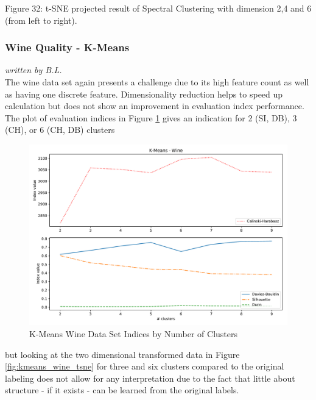  Figure 32:  t-SNE projected result of Spectral Clustering with dimension 2,4 and 6 (from left to right). \newline

\subsubsection{Wine Quality - K-Means}
\textit{written by B.L.}\\


The wine data set again presents a challenge due to its high feature count as well as having one discrete feature. Dimensionality reduction helps to speed up calculation but does not show an improvement in evaluation index performance. The plot of evaluation indices in Figure \ref{fig:kmeans_wine_indices_comparison} gives an indication for 2 (\gls{SI}, \gls{DB}), 3 (\gls{CH}), or 6 (\gls{CH}, \gls{DB}) clusters

\begin{figure}[H]
\begin{center}
\includegraphics[width=1.0\textwidth]{images/kmeans_wine_index_plot.pdf}
\end{center}
\caption{K-Means Wine Data Set Indices by Number of Clusters}
\label{fig:kmeans_wine_indices_comparison}
\end{figure}

but looking at the two dimensional transformed data in Figure \ref{fig:kmeans_wine_tsne} for three and six clusters compared to the original labeling does not allow for any interpretation due to the fact that little about structure - if it exists - can be learned from the original labels.

